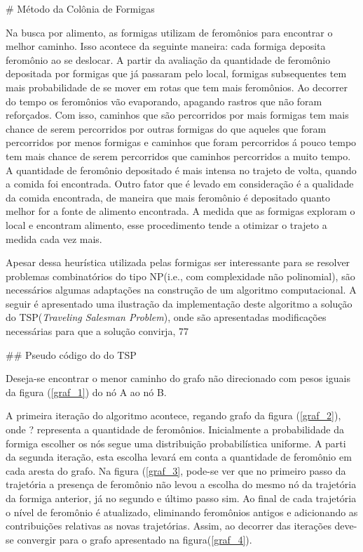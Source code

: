 # Método da Colônia de Formigas

Na busca por alimento, as formigas utilizam de feromônios para encontrar o melhor caminho.
Isso acontece da seguinte maneira: cada formiga deposita feromônio ao se deslocar. A partir
da avaliação da quantidade de feromônio depositada por formigas que já passaram pelo local,
formigas subsequentes tem mais probabilidade de se mover em rotas que tem mais feromônios. Ao
decorrer do tempo os feromônios vão evaporando, apagando rastros que não foram reforçados. 
Com isso, caminhos que são percorridos por mais formigas tem mais chance de serem 
percorridos por outras formigas do que aqueles que foram percorridos por menos formigas e 
caminhos que foram percorridos á pouco tempo tem mais chance de serem percorridos que caminhos
percorridos a muito tempo. A quantidade de feromônio depositado é mais intensa no trajeto de volta,
quando a comida foi encontrada. Outro fator que é levado em consideração é a qualidade da comida
encontrada, de maneira que mais feromônio é depositado quanto melhor for a fonte de alimento encontrada.
A medida que as formigas exploram o local e encontram alimento, esse procedimento tende a otimizar o
trajeto a medida cada vez mais.

Apesar dessa heurística utilizada pelas formigas ser interessante para se resolver problemas combinatórios 
do tipo NP(i.e., com complexidade não polinomial), são necessários algumas adaptações na construção
de um algoritmo computacional. A seguir é apresentado uma ilustração da implementação deste algoritmo a solução do TSP(\textit{Traveling Salesman Problem}),
onde são apresentadas modificações necessárias para que a solução convirja, 77

## Pseudo código do  do TSP

Deseja-se encontrar o menor caminho do grafo não direcionado com pesos iguais da figura (\ref{graf_1}) do nó A ao nó B.

A primeira iteração do algoritmo acontece, regando grafo da figura (\ref{graf_2}), onde ? representa a quantidade de feromônios.
Inicialmente a probabilidade da formiga escolher os nós segue uma distribuição probabilística uniforme. A parti da segunda iteração,
esta escolha levará em conta a quantidade de feromônio em cada aresta do grafo. Na figura (\ref{graf_3}, pode-se ver que no primeiro
passo da trajetória a presença de feromônio não levou a escolha do mesmo nó da trajetória da formiga anterior, já no segundo e último
passo sim. Ao final de cada trajetória o nível de feromônio é atualizado, eliminando feromônios antigos e adicionando as contribuições
relativas as novas trajetórias. Assim, ao decorrer das iterações deve-se convergir para o grafo apresentado na figura(\ref{graf_4}).
